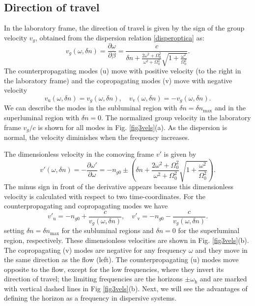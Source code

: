 \documentclass[aps,pra,reprint,amsmath,amssymb,showpacs,groupedaddress,floatfix]{revtex4-1}
\begin{document}
\subsection{Direction of travel}\label{sec3Btravel}
In the laboratory frame, the direction of travel is given by the sign of the group velocity $v_g$, obtained from the dispersion relation \eqref{disperoptica} as:
\begin{equation}
v_g(\omega,\delta n)=\frac{\partial\omega}{\partial \beta}=\frac{c}{\delta n+
	\displaystyle\frac{2\omega^2+\Omega_0^2}{\omega^2+\Omega_0^2}\displaystyle \sqrt{1+\frac{\omega^2}{\Omega_0^2}}}.
\end{equation}
The counterpropagating modes (u) move with positive velocity (to the right in the laboratory frame) and the copropagating modes (v) move with negative velocity
\begin{equation}
v_\text{u}(\omega,\delta n)=v_g(\omega,\delta n),
\quad
v_\text{v}(\omega,\delta n)=-v_g(\omega,\delta n).
\end{equation}
We can describe the modes in the subluminal region with $\delta n=\delta n_\text{max}$ and in the superluminal region with $\delta n=0$. The normalized group velocity in the laboratory frame $v_g/c$ is shown for all modes in Fig. \ref{fig3vels}(a). As the dispersion is normal, the velocity diminishes when the frequency increases.

The dimensionless velocity in the comoving frame $v'$ is given by
\begin{equation}
v'(\omega,\delta n)=-\frac{\partial\omega'}{\partial \omega}=-n_{g0}\pm\left(\delta n+\displaystyle \frac{2\omega^2+\Omega_0^2}{\omega^2+\Omega_0^2}\sqrt{1+\frac{\omega^2}{\Omega_0^2}}\right). 
\end{equation}
The minus sign in front of the derivative appears because this dimensionless velocity is calculated with respect to two time-coordinates. For the counterpropagating and copropagating modes we have
\begin{equation}
v'_\text{u}= -n_{g0}+\frac{c}{v_g(\omega,\delta n)},\quad v'_\text{v}=-n_{g0}-\frac{c}{v_g(\omega,\delta n)}.
\end{equation}
setting $\delta n =\delta n_\text{max}$ for the subluminal regions and $\delta n = 0$ for the superluminal region, respectively. These dimensionless velocities are shown in Fig. \ref{fig3vels}(b). The copropagating (v) modes are negative for any frequency $\omega$ and they move in the same direction as the flow (left). The counterpropagating (u) modes move opposite to the flow, except for the low frequencies, where they invert its direction of travel; the limiting frequencies are the horizons $\pm \omega_\text{h}$ and are marked with vertical dashed lines in Fig \ref{fig3vels}(b). Next, we will see the advantages of defining the horizon as a frequency in dispersive systems.
\end{document}
